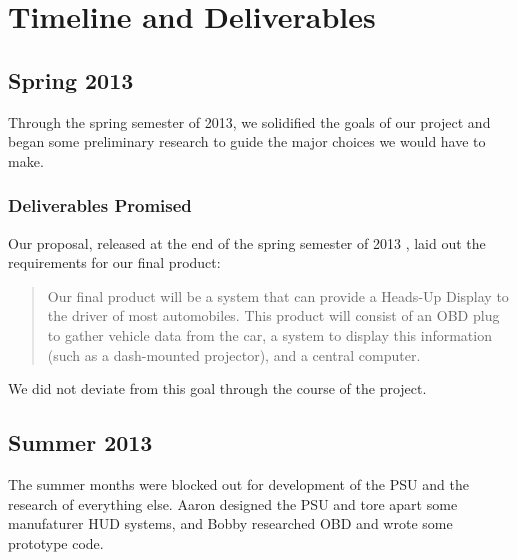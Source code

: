 \chapter{Timeline and Deliverables}


\section{Spring 2013}

Through the spring semester of 2013, we solidified the goals of our project and
began some preliminary research to guide the major choices we would have to
make.

\subsection{Deliverables Promised}

Our proposal, released at the end of the spring semester of 2013 
\cite{proposal}, laid out the requirements for our final product:

\begin{quote}
Our final product will be a system that can provide a Heads-Up Display to the
driver of most automobiles. This product will consist of an OBD plug to gather
vehicle data from the car, a system to display this information (such as a
dash-mounted projector), and a central computer.
\end{quote}

We did not deviate from this goal through the course of the project.

\section{Summer 2013}

The summer months were blocked out for development of the PSU and the research
of everything else. Aaron designed the PSU and tore apart some manufaturer HUD
systems, and Bobby researched OBD and wrote some prototype code.

